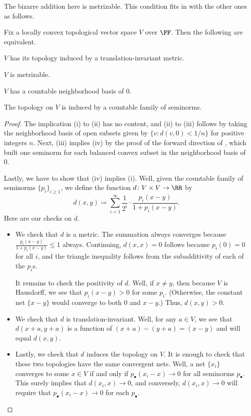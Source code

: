 \documentclass[notes.tex]{subfiles}
\begin{document}
The bizarre addition here is metrizable. This condition fits in with the other ones as follows.
\begin{proposition} \label{prop:locally-convex-to-metric}
	Fix a locally convex topological vector space $V$ over $\FF$. Then the following are equivalent.
	\begin{listroman}
		\item $V$ has its topology induced by a translation-invariant metric.
		\item $V$ is metrizable.
		\item $V$ has a countable neighborhood basis of $0$.
		\item The topology on $V$ is induced by a countable family of seminorms.
	\end{listroman}
\end{proposition}
\begin{proof}
	The implication (i) to (ii) has no content, and (ii) to (iii) follows by taking the neighborhood basis of open subsets given by $\{v:d(v,0)<1/n\}$ for positive integers $n$. Next, (iii) implies (iv) by the proof of the forward direction of , which built one seminorm for each balanced convex subset in the neighborhood basis of $0$.

	Lastly, we have to show that (iv) implies (i). Well, given the countable family of seminorms $\{p_i\}_{i\ge1}$, we define the function $d\colon V\times V\to\RR$ by
	\[d(x,y)\coloneqq\sum_{i=1}^\infty\frac1{2^i}\cdot\frac{p_i(x-y)}{1+p_i(x-y)}.\]
	Here are our checks on $d$.
	\begin{itemize}
		\item We check that $d$ is a metric. The summation always converges because $\frac{p_i(x-y)}{1+p_i(x-y)}\le1$ always. Continuing, $d(x,x)=0$ follows because $p_i(0)=0$ for all $i$, and the triangle inequality follows from the subadditivity of each of the $p_i$s.

		It remains to check the positivity of $d$. Well, if $x\ne y$, then because $V$ is Hausdorff, we see that $p_i(x-y)>0$ for some $p_i$. (Otherwise, the constant net $\{x-y\}$ would converge to both $0$ and $x-y$.) Thus, $d(x,y)>0$.

		\item We check that $d$ is translation-invariant. Well, for any $a\in V$, we see that $d(x+a,y+a)$ is a function of $(x+a)-(y+a)=(x-y)$ and will equal $d(x,y)$.

		\item Lastly, we check that $d$ induces the topology on $V$. It is enough to check that these two topologies have the same convergent nets. Well, a net $\{x_i\}$ converges to some $x\in V$ if and only if $p_\bullet(x_i-x)\to0$ for all seminorms $p_\bullet$. This surely implies that $d(x_i,x)\to0$, and conversely, $d(x_i,x)\to0$ will require that $p_\bullet(x_i-x)\to0$ for each $p_\bullet$.
		\qedhere
	\end{itemize}
\end{proof}
\end{document}
